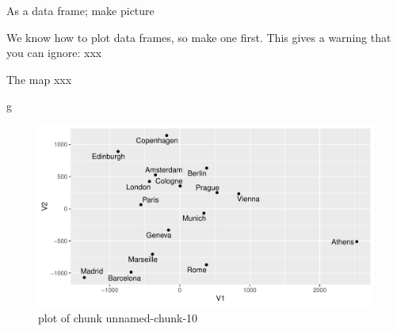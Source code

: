 \documentclass[ignorenonframetext,]{beamer}
\newenvironment{Shaded}{\begin{snugshade}}{\end{snugshade}}
\newcommand{\DataTypeTok}[1]{\textcolor[rgb]{0.13,0.29,0.53}{#1}}
\newcommand{\KeywordTok}[1]{\textcolor[rgb]{0.13,0.29,0.53}{\textbf{#1}}}
\newcommand{\NormalTok}[1]{#1}
\newcommand{\OperatorTok}[1]{\textcolor[rgb]{0.81,0.36,0.00}{\textbf{#1}}}
\newcommand{\StringTok}[1]{\textcolor[rgb]{0.31,0.60,0.02}{#1}}
\begin{document}
\begin{frame}[fragile]{As a data frame; make picture}
\protect\hypertarget{as-a-data-frame-make-picture}{}

We know how to plot data frames, so make one first. This gives a warning
that you can ignore: xxx

\normalsize

\begin{Shaded}
\end{Shaded}

\normalsize

\end{frame}

\begin{frame}[fragile]{The map xxx}
\protect\hypertarget{the-map-xxx}{}

\begin{Shaded}
\begin{Highlighting}[]
\NormalTok{g}
\end{Highlighting}
\end{Shaded}

\begin{figure}
\centering
\includegraphics{figure/unnamed-chunk-10-1.pdf}
\caption{plot of chunk unnamed-chunk-10}
\end{figure}

\end{frame}
\end{document}

